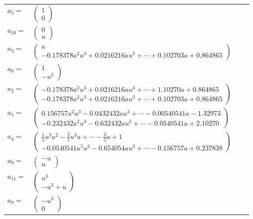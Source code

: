 \documentclass[1p]{elsarticle_modified}
\theoremstyle{definition}
\begin{document}
\begin{tabular}{m{7pt} m{180pt} m{7pt} m{180pt} }
\flushright $a_{5}=$&$\begin{pmatrix}1\\0\end{pmatrix}$ \\
\flushright $a_{10}=$&$\begin{pmatrix}0\\u\end{pmatrix}$ \\
\flushright $a_{3}=$&$\begin{pmatrix}a\\-0.178378 a^{2} u^{3}+0.0216216 a u^{3}+\cdots+0.102703 a+0.864865\end{pmatrix}$ \\
\flushright $a_{6}=$&$\begin{pmatrix}1\\- u^2\end{pmatrix}$ \\
\flushright $a_{2}=$&$\begin{pmatrix}-0.178378 a^{2} u^{3}+0.0216216 a u^{3}+\cdots+1.10270 a+0.864865\\-0.178378 a^{2} u^{3}+0.0216216 a u^{3}+\cdots+0.102703 a+0.864865\end{pmatrix}$ \\
\flushright $a_{1}=$&$\begin{pmatrix}0.156757 a^{2} u^{3}-0.0432432 a u^{3}+\cdots-0.00540541 a-1.32973\\-0.232432 a^{2} u^{3}-0.632432 a u^{3}+\cdots-0.0540541 a+2.10270\end{pmatrix}$ \\
\flushright $a_{4}=$&$\begin{pmatrix}\frac{1}{5} u^3 a^2-\frac{3}{5} u^3 a+\cdots-\frac{3}{5} a+1\\-0.0540541 a^{2} u^{3}-0.654054 a u^{3}+\cdots-0.156757 a+0.237838\end{pmatrix}$ \\
\flushright $a_{9}=$&$\begin{pmatrix}- u\\u\end{pmatrix}$ \\
\flushright $a_{11}=$&$\begin{pmatrix}u^3\\- u^3+u\end{pmatrix}$ \\
\flushright $a_{8}=$&$\begin{pmatrix}- u^3\\0\end{pmatrix}$ \\

\end{tabular}
\end{document}
